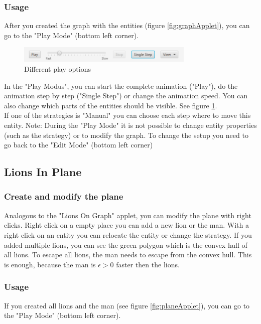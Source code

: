 \documentclass[a4paper]{article}
\begin{document}
\subsubsection*{Usage}
After you created the graph with the entities (figure \ref{fig:graphApplet}), you can go to the "Play Mode" (bottom left corner).
\begin{figure}[hbt]
  \centering
    \includegraphics[width=0.75\textwidth]{play.PNG}
  \caption{Different play options}
  \label{fig:play}
\end{figure}
In the "Play Modus", you can start the complete animation ("Play"), do the animation step by step ("Single Step") or change the animation speed. You can also change which parts of the entities should be visible. See figure \ref{fig:play}.\\
If one of the strategies is "Manual" you can choose each step where to move this entity. Note: During the "Play Mode" it is not possible to change entity properties (such as the strategy) or to modify the graph. To change the setup you need to go back to the "Edit Mode" (bottom left corner)

\subsection{Lions In Plane}\label{sec:applet_plane}

\subsubsection*{Create and modify the plane}
Analogous to the "Lions On Graph" applet, you can modify the plane with right clicks. Right click on a empty place you can add a new lion or the man. With a right click on an entity you can relocate the entity or change the strategy. If you added multiple lions, you can see the green polygon which is the convex hull of all lions. To escape all lions, the man needs to escape from the convex hull. This is enough, because the man is $\epsilon > 0$ faster then the lions.

\subsubsection*{Usage}
If you created all lions and the man (see figure \ref{fig:planeApplet}), you can go to the "Play Mode" (bottom left corner).
\end{document}
